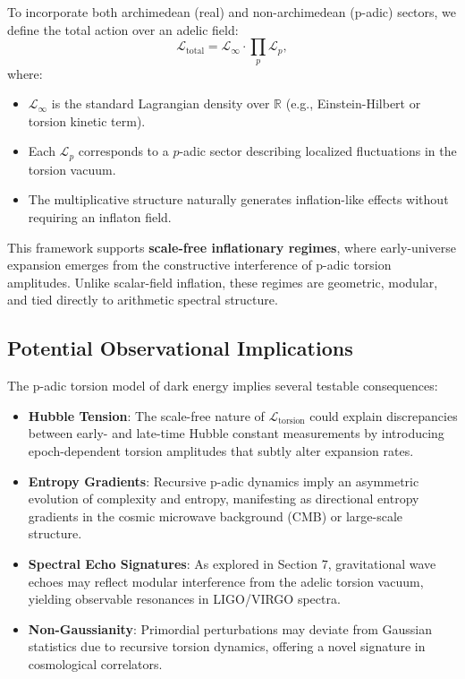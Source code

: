 \documentclass{article}
\theoremstyle{plain}
\begin{document}
To incorporate both archimedean (real) and non-archimedean (p-adic) sectors, we define the total action over an adelic field:
\[
\mathcal{L}_{\text{total}} = \mathcal{L}_\infty \cdot \prod_{p} \mathcal{L}_p,
\]
where:
\begin{itemize}
    \item $\mathcal{L}_\infty$ is the standard Lagrangian density over $\mathbb{R}$ (e.g., Einstein-Hilbert or torsion kinetic term).
    \item Each $\mathcal{L}_p$ corresponds to a $p$-adic sector describing localized fluctuations in the torsion vacuum.
    \item The multiplicative structure naturally generates inflation-like effects without requiring an inflaton field.
\end{itemize}

This framework supports \textbf{scale-free inflationary regimes}, where early-universe expansion emerges from the constructive interference of p-adic torsion amplitudes. Unlike scalar-field inflation, these regimes are geometric, modular, and tied directly to arithmetic spectral structure.

\subsection{Potential Observational Implications}

The p-adic torsion model of dark energy implies several testable consequences:

\begin{itemize}
    \item \textbf{Hubble Tension}: The scale-free nature of $\mathcal{L}_{\text{torsion}}$ could explain discrepancies between early- and late-time Hubble constant measurements by introducing epoch-dependent torsion amplitudes that subtly alter expansion rates.
    
    \item \textbf{Entropy Gradients}: Recursive p-adic dynamics imply an asymmetric evolution of complexity and entropy, manifesting as directional entropy gradients in the cosmic microwave background (CMB) or large-scale structure.

    \item \textbf{Spectral Echo Signatures}: As explored in Section 7, gravitational wave echoes may reflect modular interference from the adelic torsion vacuum, yielding observable resonances in LIGO/VIRGO spectra.

    \item \textbf{Non-Gaussianity}: Primordial perturbations may deviate from Gaussian statistics due to recursive torsion dynamics, offering a novel signature in cosmological correlators.
\end{itemize}
\end{document}
